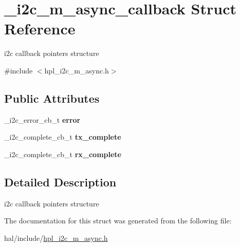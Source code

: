 \hypertarget{struct__i2c__m__async__callback}{}\section{\+\_\+i2c\+\_\+m\+\_\+async\+\_\+callback Struct Reference}
\label{struct__i2c__m__async__callback}


i2c callback pointers structure  




{\ttfamily \#include $<$hpl\+\_\+i2c\+\_\+m\+\_\+async.\+h$>$}

\subsection*{Public Attributes}
\begin{DoxyCompactItemize}
\item 
\mbox{\label{struct__i2c__m__async__callback_a155543798f44b57d5ecf2700f91895b1}} 
\+\_\+i2c\+\_\+error\+\_\+cb\+\_\+t {\bfseries error}
\item 
\mbox{\label{struct__i2c__m__async__callback_aa7b207debad12ba8ff0eebe565a60fbc}} 
\+\_\+i2c\+\_\+complete\+\_\+cb\+\_\+t {\bfseries tx\+\_\+complete}
\item 
\mbox{\label{struct__i2c__m__async__callback_aaffed67b55d69d8bb24d2484feb99a07}} 
\+\_\+i2c\+\_\+complete\+\_\+cb\+\_\+t {\bfseries rx\+\_\+complete}
\end{DoxyCompactItemize}


\subsection{Detailed Description}
i2c callback pointers structure 

The documentation for this struct was generated from the following file\+:\begin{DoxyCompactItemize}
\item 
hal/include/\hyperlink{hpl__i2c__m__async_8h}{hpl\+\_\+i2c\+\_\+m\+\_\+async.\+h}\end{DoxyCompactItemize}

